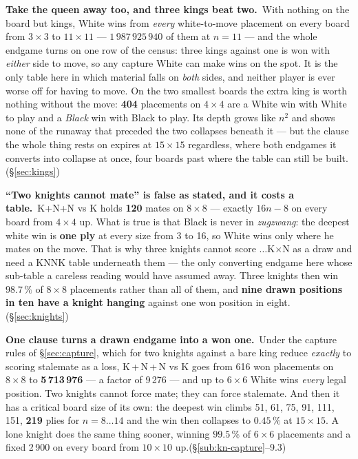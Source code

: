 \documentclass[11pt]{article}
\begin{document}
\smallskip
\noindent\textbf{Take the queen away too, and three kings beat two.}\ With
nothing on the board but kings, White wins from \emph{every} white-to-move
placement on every board from $3\times3$ to $11\times11$ --- $1\,987\,925\,940$
of them at $n=11$ --- and the whole endgame turns on one row of the census: three
kings against one is won with \emph{either} side to move, so any capture White
can make wins on the spot. It is the only table here in which material falls on
\emph{both} sides, and neither player is ever worse off for having to move. On
the two smallest boards the extra king is worth nothing without the move:
\textbf{404} placements on $4\times4$ are a White win with White to play and a
\emph{Black} win with Black to play. Its depth grows like $n^{2}$ and shows
none of the runaway that preceded the two collapses beneath it --- but the
clause the whole thing rests on expires at $15\times15$ regardless, where both
endgames it converts into collapse at once, four boards past where the table
can still be built.\hfill(\S\ref{sec:kings})

\smallskip
\noindent\textbf{``Two knights cannot mate'' is false as stated, and it costs a
table.}\ K+N+N vs K holds \textbf{120} mates on $8\times8$ --- exactly $16n-8$
on every board from $4\times4$ up. What is true is that Black is never in
\emph{zugzwang}: the deepest white win is \textbf{one ply} at every size from 3
to 16, so White wins only where he mates on the move. That is why three knights
cannot score $\ldots$K$\times$N as a draw and need a KNNK table underneath them
--- the only converting endgame here whose sub-table a careless reading would
have assumed away. Three knights then win $98.7\,\%$ of $8\times8$ placements
rather than all of them, and \textbf{nine drawn positions in ten have a knight
hanging} against one won position in eight.\hfill(\S\ref{sec:knights})

\smallskip
\noindent\textbf{One clause turns a drawn endgame into a won one.}\ Under the
capture rules of \S\ref{sec:capture}, which for two knights against a bare king reduce
\emph{exactly} to scoring stalemate as a loss, K\,+\,N\,+\,N vs K goes from
616 won placements on $8\times8$ to \textbf{5\,713\,976} --- a factor of
9\,276 --- and up to $6\times6$ White wins \emph{every} legal position. Two
knights cannot force mate; they can force stalemate. And then it has a critical
board size of its own: the deepest win climbs 51, 61, 75, 91, 111, 151,
\textbf{219} plies for $n = 8\ldots14$ and the win then collapses to
$0.45\,\%$ at $15\times15$. A lone knight does the same thing sooner, winning
$99.5\,\%$ of $6\times6$ placements and a fixed 2\,900 on every board from
$10\times10$ up.\hfill(\S\ref{sub:kn-capture}--9.3)
\end{document}
